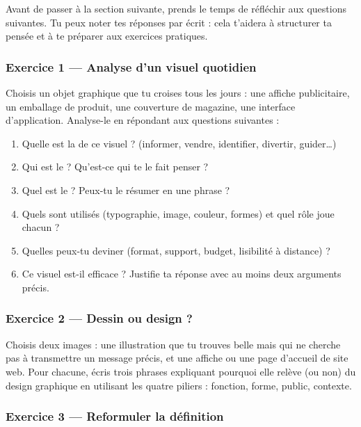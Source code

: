 Avant de passer à la section suivante, prends le temps de réfléchir aux questions suivantes. Tu peux noter tes réponses par écrit : cela t'aidera à structurer ta pensée et à te préparer aux exercices pratiques.

\subsubsection{Exercice 1 --- Analyse d'un visuel quotidien}

Choisis un objet graphique que tu croises tous les jours : une affiche publicitaire, un emballage de produit, une couverture de magazine, une interface d'application. Analyse-le en répondant aux questions suivantes :

\begin{enumerate}
    \item Quelle est la  de ce visuel ? (informer, vendre, identifier, divertir, guider\ldots)
    \item Qui est le  ? Qu'est-ce qui te le fait penser ?
    \item Quel est le  ? Peux-tu le résumer en une phrase ?
    \item Quels  sont utilisés (typographie, image, couleur, formes) et quel rôle joue chacun ?
    \item Quelles  peux-tu deviner (format, support, budget, lisibilité à distance) ?
    \item Ce visuel est-il efficace ? Justifie ta réponse avec au moins deux arguments précis.
\end{enumerate}

\subsubsection{Exercice 2 --- Dessin ou design ?}

Choisis deux images : une illustration que tu trouves belle mais qui ne cherche pas à transmettre un message précis, et une affiche ou une page d'accueil de site web. Pour chacune, écris trois phrases expliquant pourquoi elle relève (ou non) du design graphique en utilisant les quatre piliers : fonction, forme, public, contexte.

\subsubsection{Exercice 3 --- Reformuler la définition}

